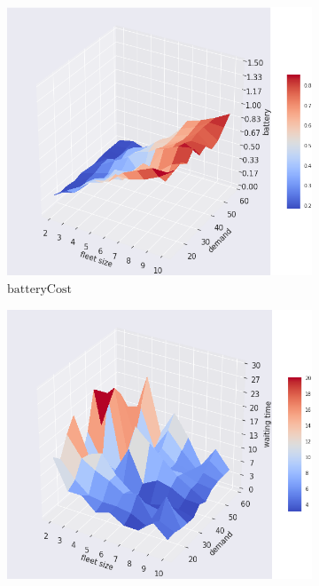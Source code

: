 \documentclass[12pt,a4paper]{article}
\begin{document}
\begin{figure}
  \centering
\begin{subfigure}[b]{0.452\textwidth}
  \includegraphics[width=\linewidth]{./images/battery.png}
  \caption{$\text{batteryCost}$}
  \label{batteryCost}
\end{subfigure}
\begin{subfigure}[b]{0.45\textwidth}
  \includegraphics[width=\linewidth]{./images/waitingtime.png}

\end{subfigure}
\end{figure}
\end{document}
